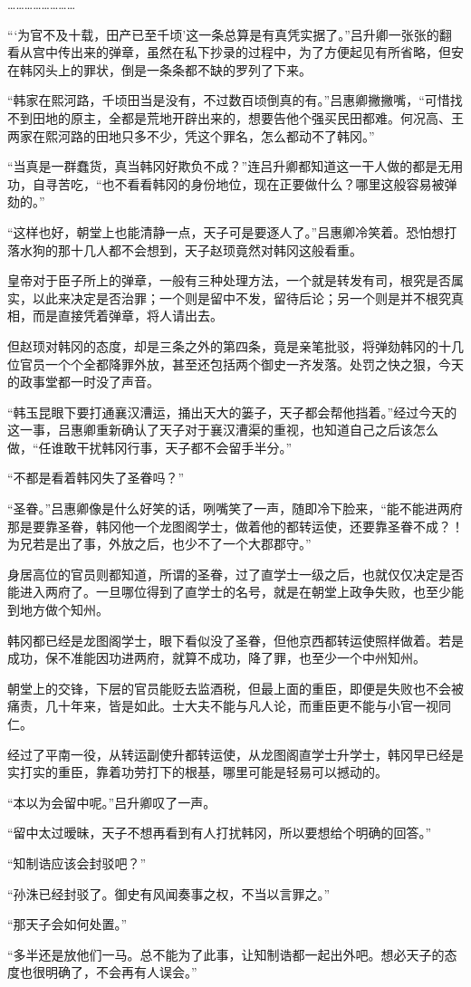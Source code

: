 ……………………

“‘为官不及十载，田产已至千顷’这一条总算是有真凭实据了。”吕升卿一张张的翻看从宫中传出来的弹章，虽然在私下抄录的过程中，为了方便起见有所省略，但安在韩冈头上的罪状，倒是一条条都不缺的罗列了下来。

“韩家在熙河路，千顷田当是没有，不过数百顷倒真的有。”吕惠卿撇撇嘴，“可惜找不到田地的原主，全都是荒地开辟出来的，想要告他个强买民田都难。何况高、王两家在熙河路的田地只多不少，凭这个罪名，怎么都动不了韩冈。”

“当真是一群蠢货，真当韩冈好欺负不成？”连吕升卿都知道这一干人做的都是无用功，自寻苦吃，“也不看看韩冈的身份地位，现在正要做什么？哪里这般容易被弹劾的。”

“这样也好，朝堂上也能清静一点，天子可是要逐人了。”吕惠卿冷笑着。恐怕想打落水狗的那十几人都不会想到，天子赵顼竟然对韩冈这般看重。

皇帝对于臣子所上的弹章，一般有三种处理方法，一个就是转发有司，根究是否属实，以此来决定是否治罪；一个则是留中不发，留待后论；另一个则是并不根究真相，而是直接凭着弹章，将人请出去。

但赵顼对韩冈的态度，却是三条之外的第四条，竟是亲笔批驳，将弹劾韩冈的十几位官员一个个全都降罪外放，甚至还包括两个御史一齐发落。处罚之快之狠，今天的政事堂都一时没了声音。

“韩玉昆眼下要打通襄汉漕运，捅出天大的篓子，天子都会帮他挡着。”经过今天的这一事，吕惠卿重新确认了天子对于襄汉漕渠的重视，也知道自己之后该怎么做，“任谁敢干扰韩冈行事，天子都不会留手半分。”

“不都是看着韩冈失了圣眷吗？”

“圣眷。”吕惠卿像是什么好笑的话，咧嘴笑了一声，随即冷下脸来，“能不能进两府那是要靠圣眷，韩冈他一个龙图阁学士，做着他的都转运使，还要靠圣眷不成？！为兄若是出了事，外放之后，也少不了一个大郡郡守。”

身居高位的官员则都知道，所谓的圣眷，过了直学士一级之后，也就仅仅决定是否能进入两府了。一旦哪位得到了直学士的名号，就是在朝堂上政争失败，也至少能到地方做个知州。

韩冈都已经是龙图阁学士，眼下看似没了圣眷，但他京西都转运使照样做着。若是成功，保不准能因功进两府，就算不成功，降了罪，也至少一个中州知州。

朝堂上的交锋，下层的官员能贬去监酒税，但最上面的重臣，即便是失败也不会被痛责，几十年来，皆是如此。士大夫不能与凡人论，而重臣更不能与小官一视同仁。

经过了平南一役，从转运副使升都转运使，从龙图阁直学士升学士，韩冈早已经是实打实的重臣，靠着功劳打下的根基，哪里可能是轻易可以撼动的。

“本以为会留中呢。”吕升卿叹了一声。

“留中太过暧昧，天子不想再看到有人打扰韩冈，所以要想给个明确的回答。”

“知制诰应该会封驳吧？”

“孙洙已经封驳了。御史有风闻奏事之权，不当以言罪之。”

“那天子会如何处置。”

“多半还是放他们一马。总不能为了此事，让知制诰都一起出外吧。想必天子的态度也很明确了，不会再有人误会。”

